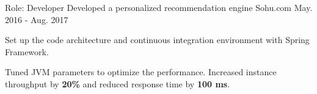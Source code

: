 \begin{cventries}

  \cventrynew
    {Role: Developer} %
    {Developed a personalized recommendation engine} %
    {Sohu.com} %
    {May. 2016 - Aug. 2017} %
    {
      \begin{cvitems} %
        \item {Set up the code architecture and continuous integration environment with Spring Framework.}
        \item {Tuned JVM parameters to optimize the performance. Increased instance throughput by \textbf{20\%} and reduced response time by \textbf{100 ms}.}
      \end{cvitems}
    } 
\end{cventries}
